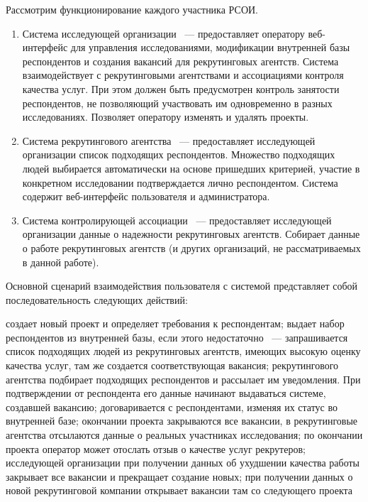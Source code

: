 Рассмотрим функционирование каждого участника РСОИ.
\begin{enumerate}[1.]
\item Система исследующей организации ~--- предоставляет оператору веб-интерфейс для управления исследованиями, модификации внутренней базы респондентов и создания вакансий для рекрутинговых агентств. Система взаимодействует с рекрутинговыми агентствами и ассоциациями контроля качества услуг. При этом должен быть предусмотрен контроль занятости респондентов, не позволяющий участвовать им одновременно в разных исследованиях. Позволяет оператору изменять и удалять проекты.
\item Система рекрутингового агентства ~--- предоставляет исследующей организации список подходящих респондентов. Множество подходящих людей выбирается автоматически на основе пришедших критерией, участие в конкретном исследовании подтверждается лично респондентом. Система содержит веб-интерфейс пользователя и администратора.
\item Система контролирующей ассоциации ~--- предоставляет исследующей организации данные о надежности рекрутинговых агентств. Собирает данные о работе рекрутинговых агентств (и других организаций, не рассматриваемых в данной работе).
\end{enumerate}

Основной сценарий взаимодействия пользователя с системой представляет собой последовательность следующих действий:
\begin{enumerate}
 создает новый проект и определяет требования к респондентам;
 выдает набор респондентов из внутренней базы, если этого недостаточно ~--- запрашивается список подходящих людей из рекрутинговых агентств, имеющих высокую оценку качества услуг, там же создается соответствующая вакансия;
 рекрутингового агентства подбирает подходящих респондентов и рассылает им уведомления. При подтверждении от респондента его данные начинают выдаваться системе, создавшей вакансию;
 договаривается с респондентами, изменяя их статус во внутренней базе;
 окончании проекта закрываются все вакансии, в рекрутинговые агентства отсылаются данные о реальных участниках исследования;
 по окончании проекта оператор может отослать отзыв о качестве услуг рекрутеров;
 исследующей организации при получении данных об ухудшении качества работы закрывает все вакансии и прекращает создание новых; при получении данных о новой рекрутинговой компании открывает вакансии там со следующего проекта
\end{enumerate}

